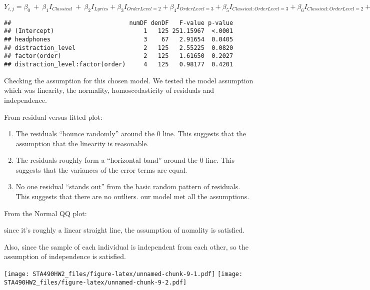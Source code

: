 \documentclass[]{article}
\providecommand{\tightlist}{%
  \setlength{\itemsep}{0pt}\setlength{\parskip}{0pt}}
\begin{document}
\(Y_{i,j}=\beta_{0}~+~\beta_1I_{Classical}~+~\beta_2I_{Lyrics}+\beta_3I_{OrderLevel=2}+\beta_4I_{OrderLevel=3}+ \beta_5I_{Classical:OrderLevel=3}+\beta_6I_{Classical:OrderLevel=2}+\beta_7I_{lyrics:OrderLevel=3}+\beta_8I_{lyrics:OrderLevel=2}+\beta_9I_{In ear: No Noise Cancelling }+\beta_10I_{Over ear: No Noise Cancelling }+\beta_11I_{Over ear: Yes Noise Cancelling }+b_i+e_{ij}\)

\begin{verbatim}
##                                 numDF denDF   F-value p-value
## (Intercept)                         1   125 251.15967  <.0001
## headphones                          3    67   2.91654  0.0405
## distraction_level                   2   125   2.55225  0.0820
## factor(order)                       2   125   1.61650  0.2027
## distraction_level:factor(order)     4   125   0.98177  0.4201
\end{verbatim}

Checking the assumption for this chosen model. We tested the model
assumption which was linearity, the normality, homoscedasticity of
residuals and independence.

From residual versus fitted plot:

\begin{enumerate}
\def\labelenumi{\arabic{enumi}.}
\tightlist
\item
  The residuals ``bounce randomly'' around the 0 line. This suggests
  that the assumption that the linearity is reasonable.
\item
  The residuals roughly form a ``horizontal band'' around the 0 line.
  This suggests that the variances of the error terms are equal.
\item
  No one residual ``stands out'' from the basic random pattern of
  residuals. This suggests that there are no outliers. our model met all
  the assumptions.
\end{enumerate}

From the Normal QQ plot:

since it's roughly a linear straight line, the assumption of nomality is
satisfied.

Also, since the sample of each individual is independent from each
other, so the assumption of independence is satisfied.

\texttt{[image: STA490HW2\_files/figure-latex/unnamed-chunk-9-1.pdf]}
\texttt{[image: STA490HW2\_files/figure-latex/unnamed-chunk-9-2.pdf]}
\end{document}

